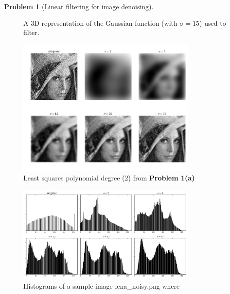\documentclass[10pt]{article}
\theoremstyle{plain}
\theoremstyle{definition}
\newtheorem{prob}{Problem}
\numberwithin{equation}{section}
\begin{document}
\begin{prob}[Linear filtering for image denoising]
\begin{figure}[p]
\begin{center}
        \caption{A 3D representation of the Gaussian function (with $\sigma=15$) used to filter.}
    \end{center}
\end{figure}
\begin{figure}[p]
    \begin{center}
        \includegraphics[width=0.8\textwidth]{varspread}
        \caption{Least squares polynomial degree (2) from \textbf{Problem 1(a)}}
    \end{center}
\end{figure}

\begin{figure}[p]
    \begin{center}
        \includegraphics[width=0.8\textwidth]{varspread-hists}
        \caption{Histograms of a sample image \textsf{lena\_noisy.png} where }
    \end{center}
\end{figure}

\end{prob}
\end{document}
